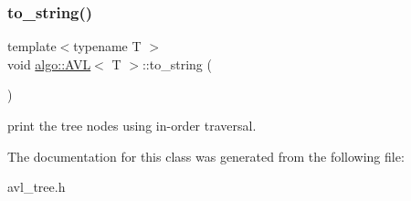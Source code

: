 \subsubsection{\texorpdfstring{to\+\_\+string()}{to\_string()}}
{\footnotesize\ttfamily template$<$typename T $>$ \\
void \hyperlink{classalgo_1_1_a_v_l}{algo\+::\+A\+VL}$<$ T $>$\+::to\+\_\+string (\begin{DoxyParamCaption}{ }\end{DoxyParamCaption})\hspace{0.3cm}{\ttfamily [inline]}}

print the tree nodes using in-\/order traversal. 

The documentation for this class was generated from the following file\+:\begin{DoxyCompactItemize}
\item 
avl\+\_\+tree.\+h\end{DoxyCompactItemize}
